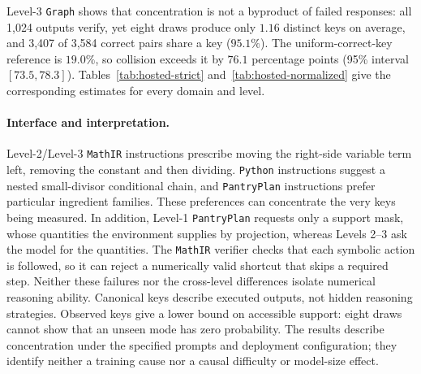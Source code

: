 Level-3 \texttt{Graph} shows that concentration is not a byproduct of failed
responses: all 1,024 outputs verify, yet eight draws produce only $1.16$
distinct keys on average, and 3,407 of 3,584 correct pairs share a key
($95.1\%$). The uniform-correct-key reference is $19.0\%$, so collision exceeds
it by $76.1$ percentage points (95\% interval $[73.5,78.3]$).
Tables~\ref{tab:hosted-strict} and~\ref{tab:hosted-normalized} give the
corresponding estimates for every domain and level.

\paragraph{Interface and interpretation.}
Level-2/Level-3 \texttt{MathIR} instructions prescribe moving the right-side variable
term left, removing the constant and then dividing. \texttt{Python} instructions
suggest a nested small-divisor conditional chain, and \texttt{PantryPlan} instructions
prefer particular ingredient families. These preferences can concentrate the
very keys being measured. In addition, Level-1 \texttt{PantryPlan} requests only a
support mask, whose quantities the environment supplies by projection, whereas
Levels 2--3 ask the model for the quantities. The \texttt{MathIR} verifier checks
that each symbolic action is followed, so it can reject a numerically valid
shortcut that skips a required step. Neither these failures nor the cross-level
differences isolate numerical reasoning ability. Canonical keys describe
executed outputs, not hidden reasoning strategies. Observed keys give a lower
bound on accessible support: eight draws cannot show that an unseen mode has
zero probability.
The results describe concentration under the specified prompts and deployment
configuration; they identify neither a training cause nor a causal difficulty
or model-size effect.
